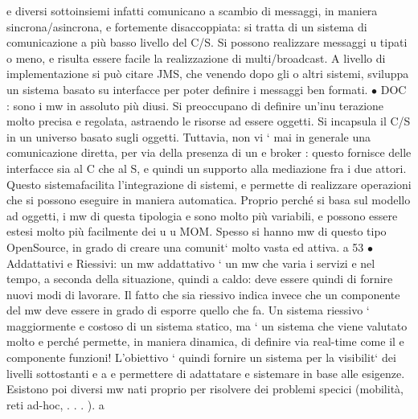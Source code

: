 \documentclass[a4paper,12pt]{article}
\begin{document}
e
diversi sottoinsiemi infatti comunicano a scambio di messaggi, in maniera
sincrona/asincrona, e fortemente disaccoppiata: si tratta di un sistema di
comunicazione a più basso livello del C/S. Si possono realizzare messaggi
u
tipati o meno, e risulta essere facile la realizzazione di multi/broadcast.
A livello di implementazione si può citare JMS, che venendo dopo gli
o
altri sistemi, sviluppa un sistema basato su interfacce per poter definire i
messaggi ben formati.
$\bullet$ DOC : sono i mw in assoluto più diusi. Si preoccupano di definire un'inu
terazione molto precisa e regolata, astraendo le risorse ad essere oggetti.
Si incapsula il C/S in un universo basato sugli oggetti. Tuttavia, non vi
` mai in generale una comunicazione diretta, per via della presenza di un
e
broker : questo fornisce delle interfacce sia al C che al S, e quindi un supporto alla mediazione fra i due attori.
Questo sistemafacilita l'integrazione
di sistemi, e permette di realizzare operazioni che si possono eseguire in
maniera automatica.
Proprio perché si basa sul modello ad oggetti, i mw di questa tipologia
e
sono molto più variabili, e possono essere estesi molto più facilmente dei
u
u
MOM. Spesso si hanno mw di questo tipo OpenSource, in grado di creare
una comunit` molto vasta ed attiva.
a
53
$\bullet$ Addattativi e Riessivi: un mw addattativo ` un mw che varia i servizi
e
nel tempo, a seconda della situazione, quindi a caldo: deve essere quindi
di fornire nuovi modi di lavorare.
Il fatto che sia riessivo indica invece che un componente del mw deve essere in grado di esporre quello che fa. Un
sistema riessivo ` maggiormente
e
costoso di un sistema statico, ma ` un sistema che viene valutato molto
e
perché permette, in maniera dinamica, di definire via real-time come il
e
componente funzioni!
L'obiettivo ` quindi fornire un sistema per la visibilit` dei livelli sottostanti
e
a
e permettere di adattatare e sistemare in base alle esigenze.
Esistono poi diversi mw nati proprio per risolvere dei problemi specici (mobilità, reti ad-hoc, . . . ).
a
\end{document}
